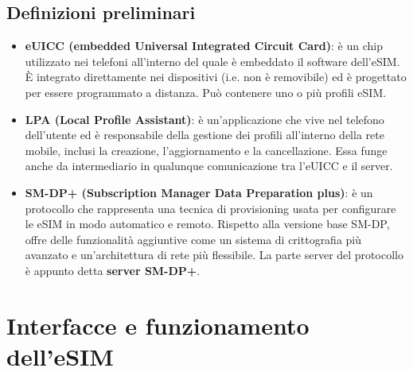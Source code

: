 \documentclass[10pt, oneside]{book}
\begin{document}
\section{Definizioni preliminari}
\begin{itemize}
\item \textbf{eUICC (embedded Universal Integrated Circuit Card)}: è un chip utilizzato nei telefoni all'interno del quale è embeddato il software dell'eSIM. È integrato direttamente nei dispositivi (i.e. non è removibile) ed è progettato per essere programmato a distanza. Può contenere uno o più profili eSIM.
\item \textbf{LPA (Local Profile Assistant)}: è un'applicazione che vive nel telefono dell'utente ed è responsabile della gestione dei profili all'interno della rete mobile, inclusi la creazione, l'aggiornamento e la cancellazione. Essa funge anche da intermediario in qualunque comunicazione tra l'eUICC e il server.
\item \textbf{SM-DP+ (Subscription Manager Data Preparation plus)}: è un protocollo che rappresenta una tecnica di provisioning usata per configurare le eSIM in modo automatico e remoto. Rispetto alla versione base SM-DP, offre delle funzionalità aggiuntive come un sistema di crittografia più avanzato e un'architettura di rete più flessibile. La parte server del protocollo è appunto detta \textbf{server SM-DP+}.
\end{itemize}

\chapter{Interfacce e funzionamento dell'eSIM}
\end{document}
